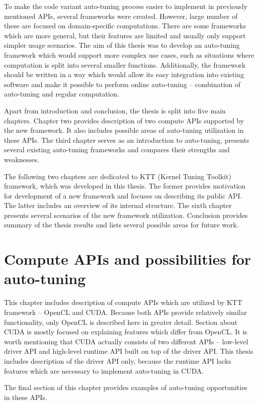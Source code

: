 \documentclass
[
    digital, %
    oneside, %
    table, %
    nolof, %
    nolot, %
    nocover %
]{fithesis3}
\begin{document}
To make the code variant auto-tuning process easier to implement in previously mentioned APIs, several frameworks were created. However, large number of
these are focused on domain-specific computations. There are some frameworks which are more general, but their features are limited and usually only
support simpler usage scenarios. The aim of this thesis was to develop an auto-tuning framework which would support more complex use cases, such as
situations where computation is split into several smaller functions. Additionally, the framework should be written in a way which would allow its easy
integration into existing software and make it possible to perform online auto-tuning -- combination of auto-tuning and regular computation.

Apart from introduction and conclusion, the thesis is split into five main chapters. Chapter two provides description of two compute APIs supported
by the new framework. It also includes possible areas of auto-tuning utilization in these APIs. The third chapter serves as an introduction to
auto-tuning, presents several existing auto-tuning frameworks and compares their strengths and weaknesses.

The following two chapters are dedicated to KTT (Kernel Tuning Toolkit) framework, which was developed in this thesis. The former provides motivation for
development of a new framework and focuses on describing its public API. The latter includes an overview of its internal structure. The sixth chapter
presents several scenarios of the new framework utilization. Conclusion provides summary of the thesis results and lists several possible areas for
future work.

\chapter{Compute APIs and possibilities for auto-tuning}
This chapter includes description of compute APIs which are utilized by KTT framework -- OpenCL and CUDA. Because both APIs provide relatively similar
functionality, only OpenCL is described here in greater detail. Section about CUDA is mostly focused on explaining features which differ from OpenCL.
It is worth mentioning that CUDA actually consists of two different APIs -- low-level driver API and high-level runtime API built on top of the driver
API. This thesis includes description of the driver API only, because the runtime API lacks features which are necessary to implement auto-tuning in CUDA.

The final section of this chapter provides examples of auto-tuning opportunities in these APIs.
\end{document}
